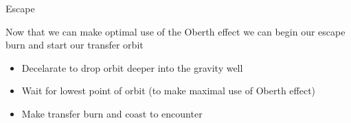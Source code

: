 \begin{frame}[t]{Escape}
    \begin{block}{}
        Now that we can make optimal use of the Oberth effect we can begin our escape burn and start our transfer orbit
    \end{block}
    \begin{block}{}
        \begin{itemize}
            \item Decelarate to drop orbit deeper into the gravity well
            \item Wait for lowest point of orbit (to make maximal use of Oberth effect)
            \item Make transfer burn and coast to encounter
        \end{itemize}
    \end{block}
\end{frame}
